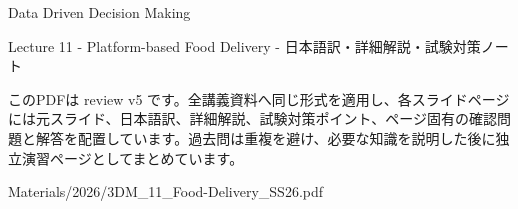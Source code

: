 \documentclass[a4paper,landscape,9pt]{article}
\begin{document}
\begin{titlepage}
\centering
\vspace*{2cm}
{\Huge Data Driven Decision Making\par}
\vspace{0.5cm}
{\Large Lecture 11 - Platform-based Food Delivery - 日本語訳・詳細解説・試験対策ノート\par}
\vspace{1cm}
\begin{minipage}{0.82\textwidth}
このPDFは review v5 です。全講義資料へ同じ形式を適用し、各スライドページには元スライド、日本語訳、詳細解説、試験対策ポイント、ページ固有の確認問題と解答を配置しています。過去問は重複を避け、必要な知識を説明した後に独立演習ページとしてまとめています。
\end{minipage}
\vfill
{\large Materials/2026/3DM\_11\_Food-Delivery\_SS26.pdf}
\end{titlepage}
\tableofcontents
\clearpage

\end{document}
